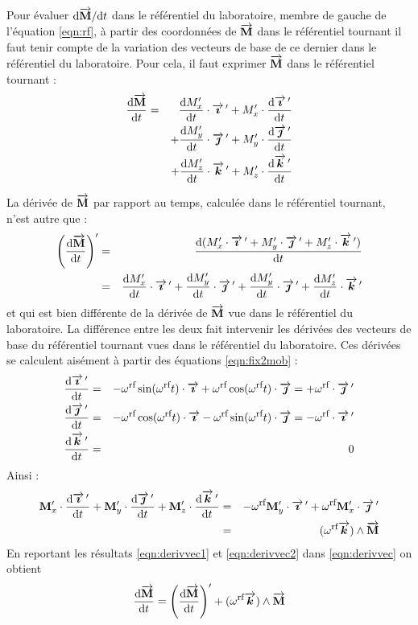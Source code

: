 Pour évaluer $\derivttxt{\aimvec}$ dans le référentiel
du laboratoire, membre de gauche de l'équation \ref{eqn:rf},
à partir des coordonnées de $\aimvec$
dans le référentiel tournant il faut tenir compte de la variation 
des vecteurs de base de ce dernier dans le référentiel du laboratoire.
Pour cela, il faut exprimer $\aimvec$ dans le référentiel tournant :
\begin{eqnarray}
\derivt{\aimvec} & = &
\derivt{\aimxs'} \cdot \iprimvec + 
\aimxs' \cdot \derivt{\iprimvec} \nonumber\\
&  & + \derivt{\aimys'} \cdot \jprimvec + 
\aimys' \cdot \derivt{\jprimvec} \nonumber\\
\label{eqn:derivvec} &  & + \derivt{\aimzs'} \cdot \kprimvec + 
\aimzs' \cdot \derivt{\kprimvec}
\end{eqnarray}

La dérivée de $\aimvec$ par rapport au temps, calculée dans le référentiel tournant, n'est autre que :
\begin{eqnarray}
\left(\derivt{\aimvec}\right)' & = &
\derivt{(\aimxs'\cdot\iprimvec+\aimys'\cdot\jprimvec+\aimzs'\cdot\kprimvec)}
\nonumber\\
\label{eqn:derivvec1}
& = & \derivt{\aimxs'} \cdot \iprimvec +
\derivt{\aimys'} \cdot \jprimvec +
\derivt{\aimys'} \cdot \jprimvec +
\derivt{\aimzs'} \cdot \kprimvec
\end{eqnarray}
et qui est bien différente de la dérivée de $\aimvec$ vue dans le référentiel
du laboratoire.
La différence entre les deux fait intervenir les dérivées des vecteurs
de base du référentiel tournant vues dans le référentiel du laboratoire.
Ces dérivées se calculent aisément à partir des équations \ref{eqn:fix2mob} :
\begin{eqnarray}
\derivt{\iprimvec} & = & -\omrf\sin(\omrft)\cdot\ivec +
\omrf\cos(\omrft)\cdot\jvec = +\omrf\cdot\jprimvec \nonumber\\
\derivt{\jprimvec} & = & -\omrf\cos(\omrft)\cdot\ivec -
\omrf\sin(\omrft)\cdot\jvec = -\omrf\cdot\iprimvec \\
\derivt{\kprimvec} & = & 0 \nonumber
\end{eqnarray}
Ainsi :
\begin{eqnarray}
\aimx' \cdot \derivt{\iprimvec} +
\aimy' \cdot \derivt{\jprimvec} +
\aimz' \cdot \derivt{\kprimvec} & = &
-\omrf\aimy'\cdot\iprimvec + \omrf\aimx'\cdot\jprimvec \nonumber\\
\label{eqn:derivvec2} & = & (\omrf\kvec) \wedge \aimvec
\end{eqnarray}
En reportant les résultats \ref{eqn:derivvec1} et \ref{eqn:derivvec2} dans
\ref{eqn:derivvec} on obtient
\begin{equation}
\derivt{\aimvec} = \left(\derivt{\aimvec}\right)'
+ (\omrf\kvec) \wedge \aimvec
\end{equation}

